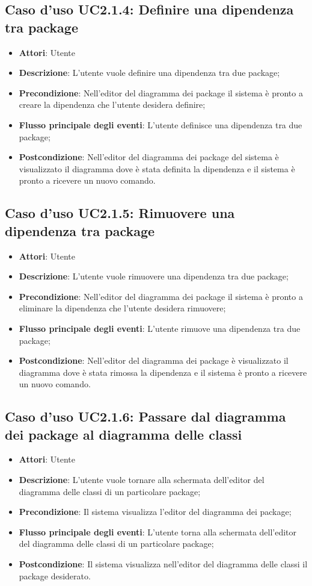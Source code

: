 \documentclass[../AnalisiDeiRequisiti.tex]{subfiles}
\begin{document}
	\subsection{Caso d'uso UC2.1.4: Definire una dipendenza tra package}
	\begin{itemize}
		\item \textbf{Attori}: Utente
		\item \textbf{Descrizione}: L'utente vuole definire una dipendenza tra due package;
		\item \textbf{Precondizione}: Nell'editor del diagramma dei package il sistema è pronto a creare la dipendenza che l'utente desidera definire;
		\item \textbf{Flusso principale degli eventi}: L'utente definisce una dipendenza tra due package;
		\item \textbf{Postcondizione}: Nell'editor del diagramma dei package del sistema è visualizzato il diagramma dove è stata definita la dipendenza e il sistema è pronto a ricevere un nuovo comando.
	\end{itemize}
	\subsection{Caso d'uso UC2.1.5: Rimuovere una dipendenza tra package}
	\begin{itemize}
		\item \textbf{Attori}: Utente
		\item \textbf{Descrizione}: L'utente vuole rimuovere una dipendenza tra due package;
		\item \textbf{Precondizione}: Nell'editor del diagramma dei package il sistema è pronto a eliminare la dipendenza che l'utente desidera rimuovere;
		\item \textbf{Flusso principale degli eventi}: L'utente rimuove una dipendenza tra due package;
		\item \textbf{Postcondizione}: Nell'editor del diagramma dei package è visualizzato il diagramma dove è stata rimossa la dipendenza e il sistema è pronto a ricevere un nuovo comando.
	\end{itemize}
	\subsection{Caso d'uso UC2.1.6: Passare dal diagramma dei package al diagramma delle classi}
	\begin{itemize}
		\item \textbf{Attori}: Utente
		\item \textbf{Descrizione}: L'utente vuole tornare alla schermata dell'editor del diagramma delle classi di un particolare package;
		\item \textbf{Precondizione}: Il sistema visualizza l'editor del diagramma dei package;
		\item \textbf{Flusso principale degli eventi}: L'utente torna alla schermata dell'editor del diagramma delle classi di un particolare package;
		\item \textbf{Postcondizione}: Il sistema visualizza nell'editor del diagramma delle classi il package desiderato.
	\end{itemize}
\end{document}
